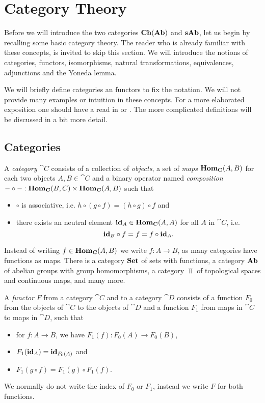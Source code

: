 \section{Category Theory}
\label{sec:Category Theory}
Before we will introduce the two categories $\mathbf{Ch}(\mathbf{Ab})$ and $\mathbf{sAb}$, let us begin by recalling some basic category theory. The reader who is already familiar with these concepts, is invited to skip this section. We will introduce the notions of categories, functors, isomorphisms, natural transformations, equivalences, adjunctions and the Yoneda lemma.

We will briefly define categories an functors to fix the notation. We will not provide many examples or intuition in these concepts. For a more elaborated exposition one should have a read in \cite{awodey} or \cite{maclane}. The more complicated definitions will be discussed in a bit more detail.

\subsection{Categories}
\begin{definition}
	A \emph{category} $\cat{C}$ consists of a collection of \emph{objects}, a set of \emph{maps} $\mathbf{Hom}_{\mathbf{C}}(A, B)$ for each two objects $A, B \in \cat{C}$ and a binary operator named \emph{composition} $-\circ-:\mathbf{Hom}_{\mathbf{C}}(B, C) \times \mathbf{Hom}_{\mathbf{C}}(A, B)$ such that
	\begin{itemize}
		\item $\circ$ is associative, i.e. $h \circ (g \circ f) = (h \circ g) \circ f$ and
		\item there exists an neutral element $\mathbf{id}_A \in \mathbf{Hom}_{\mathbf{C}}(A, A)$ for all $A$ in $\cat{C}$, i.e.
		$$ \mathbf{id}_B \circ f = f = f \circ \mathbf{id}_A. $$
	\end{itemize}
\end{definition}

Instead of writing $f \in \mathbf{Hom}_{\mathbf{C}}(A, B)$ we write $f: A \to B$, as many categories have functions as maps. There is a category $\mathbf{Set}$ of sets with functions, a category $\mathbf{Ab}$ of abelian groups with group homomorphisms, a category $\Top$ of topological spaces and continuous maps, and many more.

\begin{definition}
	A \emph{functor} $F$ from a category $\cat{C}$ and to a category $\cat{D}$ consists of a function $F_0$ from the objects of $\cat{C}$ to the objects of $\cat{D}$ and a function $F_1$ from maps in $\cat{C}$ to maps in $\cat{D}$, such that
	\begin{itemize}
		\item for $f: A \to B$, we have $F_1(f): F_0(A) \to F_0(B)$,
		\item $F_1(\mathbf{id}_A) = \mathbf{id}_{F_0(A)}$ and
		\item $F_1(g \circ f) = F_1(g) \circ F_1(f)$.
	\end{itemize}
	We normally do not write the index of $F_0$ or $F_1$, instead we write $F$ for both functions.
\end{definition}

